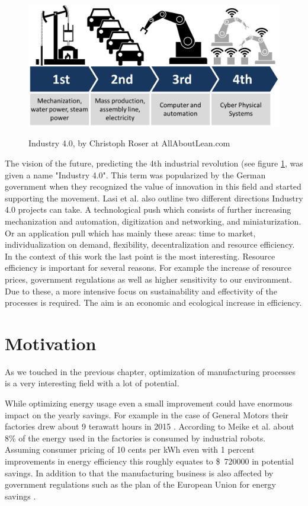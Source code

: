 \begin{figure}[ht]
	\caption{Industry 4.0, by Christoph Roser at AllAboutLean.com}
	\centering
	  \includegraphics[width=1\textwidth]{industry-40.png}
	\label{fig:Industry40}
\end{figure}

The vision of the future, predicting the 4th industrial revolution (see figure \ref{fig:Industry40}, was given a name "Industry 4.0". This term was popularized by the German government when they recognized the value of innovation in this field and started supporting the movement. Lasi et al. \cite{Industry40} also outline two different directions Industry 4.0 projects can take. A technological push which consists of further increasing mechanization and automation, digitization and networking, and miniaturization. Or an application pull which has mainly these areas: time to market, individualization on demand, flexibility, decentralization and resource efficiency. \\

In the context of this work the last point is the most interesting.
Resource efficiency is important for several reasons.
For example the increase of resource prices, government regulations as well as higher sensitivity to our environment. Due to these, a more intensive focus on sustainability and effectivity of the processes is required. 
The aim is an economic and ecological increase in efficiency. 

\section{Motivation}

As we touched in the previous chapter, optimization of manufacturing processes is a very interesting field with a lot of potential.

While optimizing energy usage even a small improvement could have enormous impact on the yearly savings. For example in the case of General Motors their factories drew about 9 terawatt hours in 2015 \cite{GMEnergySpending}. According to Meike et al. \cite{Meike8Percent} about 8\% of the energy used in the factories is consumed by industrial robots. Assuming consumer pricing of 10 cents per kWh even with 1 percent improvements in energy efficiency this roughly equates to \$~720000 in potential savings. In addition to that the manufacturing business is also affected by government regulations such as the plan of the European Union for energy savings \cite{EUElectricity}. \\

